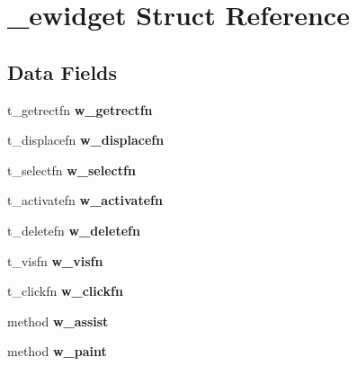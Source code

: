 \hypertarget{struct__ewidget}{\section{\-\_\-ewidget Struct Reference}
\label{struct__ewidget}
}
\subsection*{Data Fields}
\begin{DoxyCompactItemize}
\item 
\hypertarget{struct__ewidget_ae1c0ed04f382d1e9802e764a923e2d4f}{t\-\_\-getrectfn {\bfseries w\-\_\-getrectfn}}\label{struct__ewidget_ae1c0ed04f382d1e9802e764a923e2d4f}

\item 
\hypertarget{struct__ewidget_ade5d23ff0ed3290f9292bd3e7b1776ad}{t\-\_\-displacefn {\bfseries w\-\_\-displacefn}}\label{struct__ewidget_ade5d23ff0ed3290f9292bd3e7b1776ad}

\item 
\hypertarget{struct__ewidget_a7b9c0c21fc2d01d8fe20da881140c0d5}{t\-\_\-selectfn {\bfseries w\-\_\-selectfn}}\label{struct__ewidget_a7b9c0c21fc2d01d8fe20da881140c0d5}

\item 
\hypertarget{struct__ewidget_ade55a1f252ff2ca9edc39ee303e5ce8c}{t\-\_\-activatefn {\bfseries w\-\_\-activatefn}}\label{struct__ewidget_ade55a1f252ff2ca9edc39ee303e5ce8c}

\item 
\hypertarget{struct__ewidget_aa0bf43cdfe76feca7465aecc0fe8a0ab}{t\-\_\-deletefn {\bfseries w\-\_\-deletefn}}\label{struct__ewidget_aa0bf43cdfe76feca7465aecc0fe8a0ab}

\item 
\hypertarget{struct__ewidget_af56082f3c47e55ee39a21da9c962c01b}{t\-\_\-visfn {\bfseries w\-\_\-visfn}}\label{struct__ewidget_af56082f3c47e55ee39a21da9c962c01b}

\item 
\hypertarget{struct__ewidget_a8cf645322b7005bc821feaafa06d4b8d}{t\-\_\-clickfn {\bfseries w\-\_\-clickfn}}\label{struct__ewidget_a8cf645322b7005bc821feaafa06d4b8d}

\item 
\hypertarget{struct__ewidget_a8f4ac8e32f3739dbf78d4c169342e5bb}{method {\bfseries w\-\_\-assist}}\label{struct__ewidget_a8f4ac8e32f3739dbf78d4c169342e5bb}

\item 
\hypertarget{struct__ewidget_ab407d0b5b17884aee4bdc661f5590126}{method {\bfseries w\-\_\-paint}}\label{struct__ewidget_ab407d0b5b17884aee4bdc661f5590126}


\end{DoxyCompactItemize}
